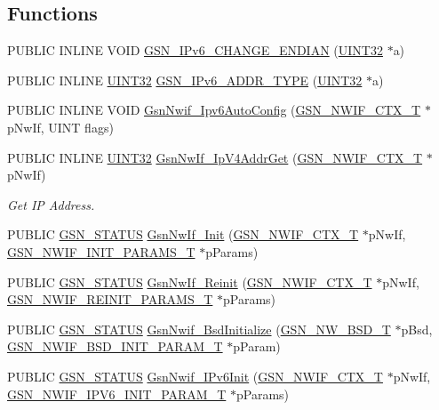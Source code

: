 \subsection*{Functions}
\begin{DoxyCompactItemize}
\item 
PUBLIC INLINE VOID \hyperlink{a00534_a5ad130ccf73221792798ec396a497eec}{GSN\_\-IPv6\_\-CHANGE\_\-ENDIAN} (\hyperlink{a00660_gae1e6edbbc26d6fbc71a90190d0266018}{UINT32} $\ast$a)
\item 
PUBLIC INLINE \hyperlink{a00660_gae1e6edbbc26d6fbc71a90190d0266018}{UINT32} \hyperlink{a00534_afd7bdd70a054ec8427b4f0043dbac155}{GSN\_\-IPv6\_\-ADDR\_\-TYPE} (\hyperlink{a00660_gae1e6edbbc26d6fbc71a90190d0266018}{UINT32} $\ast$a)
\item 
PUBLIC INLINE VOID \hyperlink{a00534_aee3688d173845d135daba50d9fb66da9}{GsnNwif\_\-Ipv6AutoConfig} (\hyperlink{a00167}{GSN\_\-NWIF\_\-CTX\_\-T} $\ast$pNwIf, UINT flags)
\item 
PUBLIC INLINE \hyperlink{a00660_gae1e6edbbc26d6fbc71a90190d0266018}{UINT32} \hyperlink{a00670_ga4dd1a9b0b97290fe2749d1f9834f5c19}{GsnNwIf\_\-IpV4AddrGet} (\hyperlink{a00167}{GSN\_\-NWIF\_\-CTX\_\-T} $\ast$pNwIf)
\begin{DoxyCompactList}\small\item\em Get IP Address. \end{DoxyCompactList}\item 
PUBLIC \hyperlink{a00660_gada5951904ac6110b1fa95e51a9ddc217}{GSN\_\-STATUS} \hyperlink{a00534_a80312c55009d536cdf5229c6535587c2}{GsnNwIf\_\-Init} (\hyperlink{a00167}{GSN\_\-NWIF\_\-CTX\_\-T} $\ast$pNwIf, \hyperlink{a00169}{GSN\_\-NWIF\_\-INIT\_\-PARAMS\_\-T} $\ast$pParams)
\item 
PUBLIC \hyperlink{a00660_gada5951904ac6110b1fa95e51a9ddc217}{GSN\_\-STATUS} \hyperlink{a00534_a7ae07eb99df459cf19b0988a44878fa1}{GsnNwIf\_\-Reinit} (\hyperlink{a00167}{GSN\_\-NWIF\_\-CTX\_\-T} $\ast$pNwIf, \hyperlink{a00175}{GSN\_\-NWIF\_\-REINIT\_\-PARAMS\_\-T} $\ast$pParams)
\item 
PUBLIC \hyperlink{a00660_gada5951904ac6110b1fa95e51a9ddc217}{GSN\_\-STATUS} \hyperlink{a00534_a354eab3e8d1f1df084e53e22cf948c37}{GsnNwif\_\-BsdInitialize} (\hyperlink{a00163}{GSN\_\-NW\_\-BSD\_\-T} $\ast$pBsd, \hyperlink{a00166}{GSN\_\-NWIF\_\-BSD\_\-INIT\_\-PARAM\_\-T} $\ast$pParam)
\item 
PUBLIC \hyperlink{a00660_gada5951904ac6110b1fa95e51a9ddc217}{GSN\_\-STATUS} \hyperlink{a00534_a8ec80e9053bfb9952c35af829f14359a}{GsnNwif\_\-IPv6Init} (\hyperlink{a00167}{GSN\_\-NWIF\_\-CTX\_\-T} $\ast$pNwIf, \hyperlink{a00174}{GSN\_\-NWIF\_\-IPV6\_\-INIT\_\-PARAM\_\-T} $\ast$pParams)

\end{DoxyCompactItemize}
